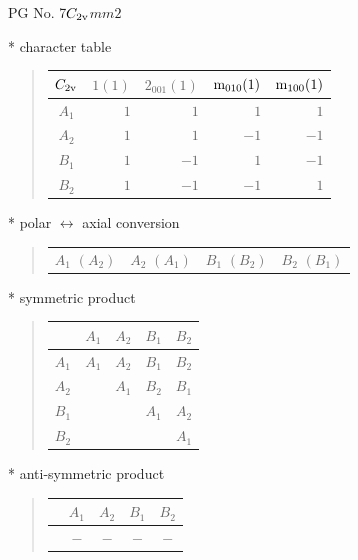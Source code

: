 \documentclass[fleqn,8pt,landscape]{jsarticle}
\begin{document}
\setcounter{MaxMatrixCols}{32}

\renewcommand{\tablename}{Table~}
\renewcommand{\figurename}{Figure~}
\begin{center}
\LARGE
PG No. 7\quad$C_{\rm 2v}$\quad$mm2$\quad[ orthorhombic ]
\end{center}

* character table
\begin{quote}
\begin{tabular}{crrrr} \hline \hline
$ C_{\rm 2v} $ & $ 1(1) $ & $ 2{}_{001}(1) $ & $ {\rm m}_{010}(1) $ & $ {\rm m}_{100}(1) $ \\ \hline
$ A_{1} $ & $ 1 $ & $ 1 $ & $ 1 $ & $ 1 $ \\
$ A_{2} $ & $ 1 $ & $ 1 $ & $ -1 $ & $ -1 $ \\
$ B_{1} $ & $ 1 $ & $ -1 $ & $ 1 $ & $ -1 $ \\
$ B_{2} $ & $ 1 $ & $ -1 $ & $ -1 $ & $ 1 $ \\
 \hline \hline
\end{tabular}
\end{quote}

* polar $\leftrightarrow$ axial conversion
\begin{quote}
\begin{tabular}{cccc}
$ A_{1}\,\,(A_{2}) $ & $ A_{2}\,\,(A_{1}) $ & $ B_{1}\,\,(B_{2}) $ & $ B_{2}\,\,(B_{1}) $
\end{tabular}
\end{quote}

* symmetric product
\begin{quote}
\begin{tabular}{c|cccc} \hline \hline
 & $ A_{1} $ & $ A_{2} $ & $ B_{1} $ & $ B_{2} $ \\ \hline
$ A_{1} $ & $ A_{1} $ & $ A_{2} $ & $ B_{1} $ & $ B_{2} $ \\
$ A_{2} $ & $  $ & $ A_{1} $ & $ B_{2} $ & $ B_{1} $ \\
$ B_{1} $ & $  $ & $  $ & $ A_{1} $ & $ A_{2} $ \\
$ B_{2} $ & $  $ & $  $ & $  $ & $ A_{1} $ \\
 \hline \hline
\end{tabular}
\end{quote}

* anti-symmetric product
\begin{quote}
\begin{tabular}{ccccc} \hline \hline
 & $ A_{1} $ & $ A_{2} $ & $ B_{1} $ & $ B_{2} $ \\ \hline
$  $ & $ - $ & $ - $ & $ - $ & $ - $ \\
 \hline \hline
\end{tabular}
\end{quote}
\end{document}
